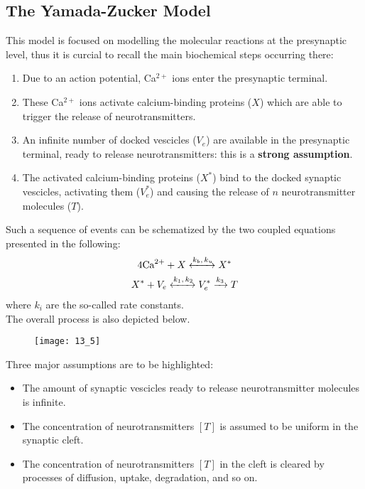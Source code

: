 \subsection{The Yamada-Zucker Model}
This model is focused on modelling the molecular reactions at the presynaptic level, thus
it is curcial to recall the main biochemical steps occurring there:
\begin{enumerate}
    \item Due to an action potential, Ca\({}^{2+}\) ions enter the presynaptic terminal.
    \item These Ca\({}^{2+}\) ions activate calcium-binding proteins (\(X\)) which are able to
          trigger the release of neurotransmitters.
    \item An infinite number of docked vescicles (\(V_{e}\)) are available in the presynaptic terminal,
          ready to release neurotransmitters: this is a \textbf{strong assumption}.
    \item The activated calcium-binding proteins (\(X^{*}\)) bind to the docked synaptic vescicles,
          activating them (\(V_{e}^{*}\)) and causing the release of \(n\) neurotransmitter molecules (\(T\)).
\end{enumerate}
Such a sequence of events can be schematized by the two coupled equations presented in the following:
\begin{gather*}
    4\text{Ca}^{2+}+X\xleftrightarrow{k_{b},\,k_{u}}X^{*}\\
    X^{*}+V_{e}\xleftrightarrow{k_{1},\,k_{2}}V_{e}^{*}\xrightarrow{k_{3}}T
\end{gather*}
where \(k_{i}\) are the so-called rate constants.\\
The overall process is also depicted below.
\begin{figure}[H]
    \texttt{[image: 13\_5]}
    \centering
\end{figure}
Three major assumptions are to be highlighted:
\begin{itemize}
    \item The amount of synaptic vescicles ready to release neurotransmitter molecules
          is infinite.
    \item The concentration of neurotransmitters \([T]\) is assumed to be uniform
          in the synaptic cleft.
    \item The concentration of neurotransmitters \([T]\) in the cleft is cleared
          by processes of diffusion, uptake, degradation, and so on.
\end{itemize}
